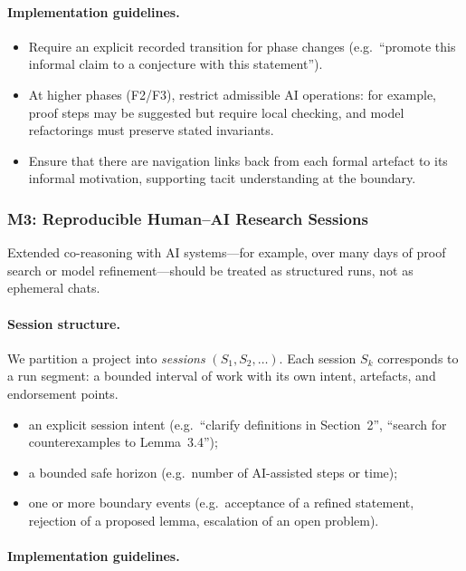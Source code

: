 \paragraph{Implementation guidelines.}

\begin{itemize}
\item Require an explicit recorded transition for phase changes
      (e.g.\ ``promote this informal claim to a conjecture with this statement'').
  \item At higher phases (F2/F3), restrict admissible AI operations:
        for example, proof steps may be suggested but require local checking,
        and model refactorings must preserve stated invariants.
  \item Ensure that there are navigation links back from each formal artefact
        to its informal motivation, supporting tacit understanding at the
        boundary.
\end{itemize}

\subsubsection*{M3: Reproducible Human--AI Research Sessions}

Extended co-reasoning with AI systems---for example, over many days of proof
search or model refinement---should be treated as structured runs, not as
ephemeral chats.

\paragraph{Session structure.}
We partition a project into \emph{sessions} $(S_1, S_2, \dots)$.
Each session $S_k$ corresponds to a run segment: a bounded interval of work with its own intent,
artefacts, and endorsement points.

\begin{itemize}
  \item an explicit session intent (e.g.\ ``clarify definitions in Section~2'',
        ``search for counterexamples to Lemma~3.4'');
  \item a bounded safe horizon (e.g.\ number of AI-assisted steps or time);
  \item one or more boundary events (e.g.\ acceptance of a refined statement,
        rejection of a proposed lemma, escalation of an open problem).
\end{itemize}

\paragraph{Implementation guidelines.}

